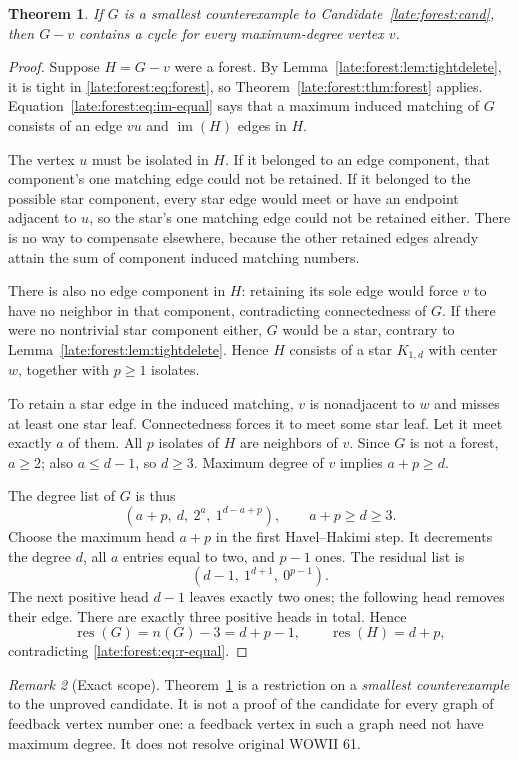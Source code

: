 \documentclass[11pt,a4paper]{article}
\newtheorem{theorem}{Theorem}[section]
\theoremstyle{definition}\newtheorem{definition}[theorem]{Definition}
\theoremstyle{remark}\newtheorem{remark}[theorem]{Remark}
\newcommand{\res}{\operatorname{res}}
\newcommand{\im}{\operatorname{im}}
\begin{document}
\begin{theorem}\label{late:forest:thm:noapex}
If $G$ is a smallest counterexample to Candidate~\ref{late:forest:cand}, then $G-v$
contains a cycle for every maximum-degree vertex $v$.
\end{theorem}
\begin{proof}
Suppose $H=G-v$ were a forest. By Lemma~\ref{late:forest:lem:tightdelete}, it is tight in
\eqref{late:forest:eq:forest}, so Theorem~\ref{late:forest:thm:forest} applies.
Equation~\eqref{late:forest:eq:im-equal} says that a maximum induced matching of $G$
consists of an edge $vu$ and $\im(H)$ edges in $H$.

The vertex $u$ must be isolated in $H$. If it belonged to an edge component,
that component's one matching edge could not be retained. If it belonged to
the possible star component, every star edge would meet or have an endpoint
adjacent to $u$, so the star's one matching edge could not be retained either.
There is no way to compensate elsewhere, because the other retained edges
already attain the sum of component induced matching numbers.

There is also no edge component in $H$: retaining its sole edge would force
$v$ to have no neighbor in that component, contradicting connectedness of
$G$. If there were no nontrivial star component either, $G$ would be a star,
contrary to Lemma~\ref{late:forest:lem:tightdelete}. Hence $H$ consists of a star $K_{1,d}$
with center $w$, together with $p\ge1$ isolates.

To retain a star edge in the induced matching, $v$ is nonadjacent to $w$ and
misses at least one star leaf. Connectedness forces it to meet some star leaf.
Let it meet exactly $a$ of them. All $p$ isolates of $H$ are neighbors of $v$.
Since $G$ is not a forest, $a\ge2$; also $a\le d-1$, so $d\ge3$.
Maximum degree of $v$ implies $a+p\ge d$.

The degree list of $G$ is thus
\[
(a+p,\ d,\ 2^a,\ 1^{d-a+p}),
\qquad a+p\ge d\ge3.
\]
Choose the maximum head $a+p$ in the first Havel--Hakimi step. It decrements
the degree $d$, all $a$ entries equal to two, and $p-1$ ones. The residual
list is
\[
(d-1,\ 1^{d+1},\ 0^{p-1}).
\]
The next positive head $d-1$ leaves exactly two ones; the following head
removes their edge. There are exactly three positive heads in total. Hence
\[
\res(G)=n(G)-3=d+p-1,
\qquad \res(H)=d+p,
\]
contradicting \eqref{late:forest:eq:r-equal}.
\end{proof}

\begin{remark}[Exact scope]
Theorem~\ref{late:forest:thm:noapex} is a restriction on a \emph{smallest counterexample}
to the unproved candidate. It is not a proof of the candidate for every graph
of feedback vertex number one: a feedback vertex in such a graph need not
have maximum degree. It does not resolve original WOWII 61.
\end{remark}
\end{document}

